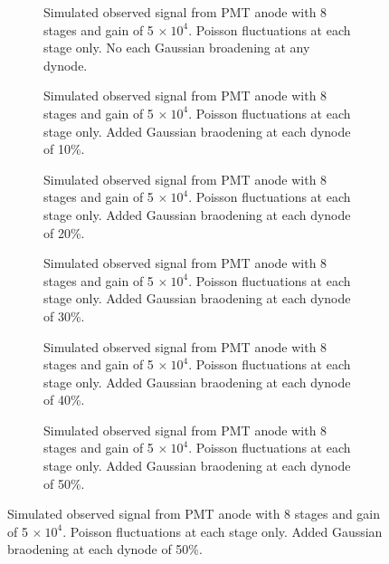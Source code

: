 \begin{figure}
\centering
\begin{subfigure}[b]{0.44\textwidth}
\caption{Simulated observed signal from PMT anode with 8 stages and gain of 5 $\times \ 10^4$. Poisson fluctuations at each stage only. No each Gaussian broadening at any dynode.}
\end{subfigure}
\hspace{3mm}
\begin{subfigure}[b]{0.44\textwidth}
\caption{Simulated observed signal from PMT anode with 8 stages and gain of 5 $\times \ 10^4$. Poisson fluctuations at each stage only. Added Gaussian braodening at each dynode of 10\%.}
\end{subfigure}

\vspace{3mm}

\begin{subfigure}[b]{0.44\textwidth}
\caption{Simulated observed signal from PMT anode with 8 stages and gain of 5 $\times \ 10^4$. Poisson fluctuations at each stage only. Added Gaussian braodening at each dynode of 20\%.}
\end{subfigure}
\hspace{3mm}
\begin{subfigure}[b]{0.44\textwidth}
\caption{Simulated observed signal from PMT anode with 8 stages and gain of 5 $\times \ 10^4$. Poisson fluctuations at each stage only. Added Gaussian braodening at each dynode of 30\%.}
\end{subfigure}

\vspace{3mm}

\begin{subfigure}[b]{0.44\textwidth}
\caption{Simulated observed signal from PMT anode with 8 stages and gain of 5 $\times \ 10^4$. Poisson fluctuations at each stage only. Added Gaussian braodening at each dynode of 40\%.}
\end{subfigure}
\hspace{3mm}
\begin{subfigure}[b]{0.44\textwidth}
\caption{Simulated observed signal from PMT anode with 8 stages and gain of 5 $\times \ 10^4$. Poisson fluctuations at each stage only. Added Gaussian braodening at each dynode of 50\%.}
\end{subfigure}
\end{figure}

